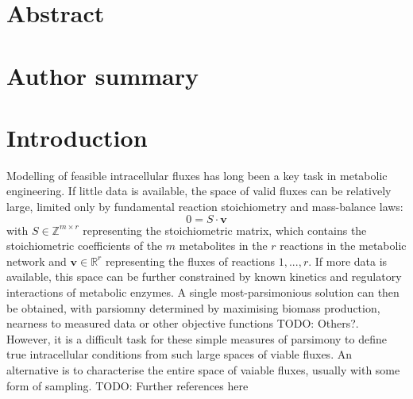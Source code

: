 \documentclass[10pt,letterpaper]{article}
\begin{document}
\section*{Abstract}


\section*{Author summary}


\linenumbers

\section*{Introduction}

Modelling of feasible intracellular fluxes has long been a key task in metabolic engineering.
If little data is available, the space of valid fluxes can be relatively large, limited only by fundamental reaction stoichiometry and mass-balance laws:
\[
    0 = S\cdot \mathbf{v} \label{eq:steady_state}
\]
with $S \in \mathbb{Z}^{m\times r}$ representing the stoichiometric matrix, which contains the stoichiometric coefficients of the $m$ metabolites in the $r$ reactions in the metabolic network and $\mathbf{v} \in \mathbb{R}^r$ representing the fluxes of reactions $1,...,r$.
If more data is available, this space can be further constrained by known kinetics and regulatory interactions of metabolic enzymes.
A single most-parsimonious solution can then be obtained, with parsiomny determined by maximising biomass production, nearness to measured data or other objective functions {TODO: Others?}.
However, it is a difficult task for these simple measures of parsimony to define true intracellular conditions from such large spaces of viable fluxes.
An alternative is to characterise the entire space of vaiable fluxes, usually with some form of sampling. {TODO: Further references here}
\end{document}
